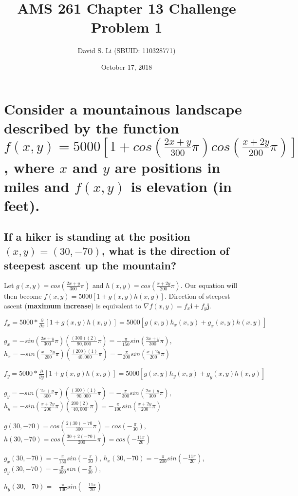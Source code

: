 \documentclass{article}
\title{AMS 261 Chapter 13 Challenge Problem 1}
\author{David S. Li (SBUID: 110328771)}
\date{October 17, 2018}
\begin{document}
\maketitle

\section{Consider a mountainous landscape described by the function $f(x, y) = 5000[1 + cos(\frac{2x + y}{300}\pi)cos(\frac{x + 2y}{200}\pi)]$, where $x$ and $y$ are positions in miles and $f(x, y)$ is elevation (in feet).}
\subsection{If a hiker is standing at the position $(x, y) = (30, -70)$, what is the direction of steepest ascent up the mountain?}

\par\noindent\Large Let $g(x, y) = cos(\frac{2x + y}{300}\pi)$ and $h(x, y) = cos(\frac{x + 2y}{200}\pi)$. Our equation will then become $f(x, y) = 5000[1 + g(x, y)h(x, y)]$.  Direction of steepest ascent (\textbf{maximum increase}) is equivalent to $\nabla f(x, y) = f_{x}\textbf{i} + f_{y}\textbf{j}$.\vspace{0.25cm}

\par\noindent\Large $f_{x} = 5000 * \frac{\partial}{\partial x}[1 + g(x, y)h(x, y)] = 5000[g(x, y)h_{x}(x, y) + g_{x}(x, y)h(x, y)]$
\par\noindent\Large $g_{x} = -sin(\frac{2x + y}{300}\pi)(\frac{(300)(2)}{90,000}\pi) = -\frac{\pi}{150}sin(\frac{2x + y}{300}\pi)$, $h_{x} = -sin(\frac{x + 2y}{200}\pi)(\frac{(200)(1)}{40,000}\pi)= -\frac{\pi}{200}sin(\frac{x + 2y}{200}\pi)$\vspace{0.25cm}

\par\noindent\Large $f_{y} = 5000 * \frac{\partial}{\partial y}[1 + g(x, y)h(x, y)] = 5000[g(x, y)h_{y}(x, y) + g_{y}(x, y)h(x, y)]$
\par\noindent\Large $g_{y} = -sin(\frac{2x + y}{300}\pi)(\frac{(300)(1)}{90,000}\pi) = -\frac{\pi}{300}sin(\frac{2x + y}{300}\pi)$, $h_{y} = -sin(\frac{x + 2y}{200}\pi)(\frac{200(2)}{40,000}\pi) = -\frac{\pi}{100}sin(\frac{x + 2y}{200}\pi)$\vspace{0.25cm}

\par\noindent\Large $g(30, -70) = cos(\frac{2(30) - 70}{300}\pi) = cos(-\frac{\pi}{30})$, $h(30, -70) = cos(\frac{30 + 2(-70)}{200}\pi) = cos(-\frac{11\pi}{20})$
\par\noindent\Large $g_{x}(30, -70) = -\frac{\pi}{150}sin(-\frac{\pi}{30})$, $h_{x}(30, -70) = -\frac{\pi}{200}sin(-\frac{11\pi}{20})$, $g_{y}(30, -70) = -\frac{\pi}{300}sin(-\frac{\pi}{30})$,
\par\noindent\Large $h_{y}(30, -70) = -\frac{\pi}{100}sin(-\frac{11\pi}{20})$\vspace{0.25cm}
\end{document}

